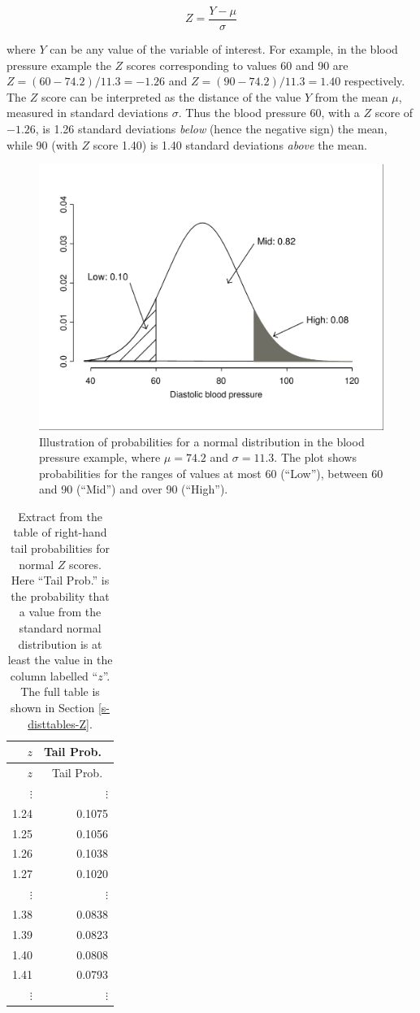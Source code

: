 \documentclass[11pt,a4paper,openany]{book}
\begin{document}
\begin{equation}Z = \frac{Y-\mu}{\sigma}
\label{eq:Zscore}\end{equation}

where \(Y\) can be any value of the variable of interest. For example,
in the blood pressure example the \(Z\) scores corresponding to values
60 and 90 are \(Z=(60-74.2)/11.3=-1.26\) and \(Z=(90-74.2)/11.3=1.40\)
respectively. The \(Z\) score can be interpreted as the distance of the
value \(Y\) from the mean \(\mu\), measured in standard deviations
\(\sigma\). Thus the blood pressure 60, with a \(Z\) score of \(-1.26\),
is 1.26 standard deviations \emph{below} (hence the negative sign) the
mean, while 90 (with \(Z\) score 1.40) is 1.40 standard deviations
\emph{above} the mean.

\begin{figure}[htbp]
\centering
\includegraphics[width=12.00000cm]{normbp.pdf}
\caption{\label{fig:f-normbp} Illustration of probabilities for a normal
distribution in the blood pressure example, where \(\mu=74.2\) and
\(\sigma=11.3\). The plot shows probabilities for the ranges of values
at most 60 (``Low''), between 60 and 90 (``Mid'') and over 90
(``High'').}
\end{figure}

\begin{longtable}[]{@{}rr@{}}
\caption{\label{tab:t-normtab} Extract from the table of right-hand tail
probabilities for normal \(Z\) scores. Here ``Tail Prob.'' is the
probability that a value from the standard normal distribution is at
least the value in the column labelled ``\(z\)''. The full table is
shown in Section \ref{s-disttables-Z}.}\tabularnewline
\toprule
\(z\) & Tail Prob.~\tabularnewline
\midrule
\endfirsthead
\toprule
\(z\) & Tail Prob.~\tabularnewline
\midrule
\endhead
\(\vdots\) & \(\vdots\)\tabularnewline
1.24 & 0.1075\tabularnewline
1.25 & 0.1056\tabularnewline
1.26 & 0.1038\tabularnewline
1.27 & 0.1020\tabularnewline
\(\vdots\) & \(\vdots\)\tabularnewline
1.38 & 0.0838\tabularnewline
1.39 & 0.0823\tabularnewline
1.40 & 0.0808\tabularnewline
1.41 & 0.0793\tabularnewline
\(\vdots\) & \(\vdots\)\tabularnewline
\bottomrule
\end{longtable}
\end{document}
